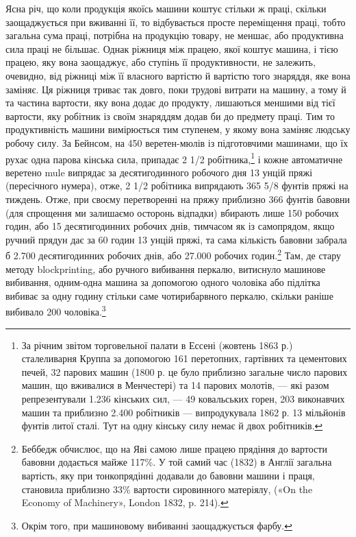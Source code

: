 Ясна річ, що коли продукція якоїсь машини коштує стільки ж
праці, скільки заощаджується при вживанні її, то відбувається
просте переміщення праці, тобто загальна сума праці, потрібна
на продукцію товару, не меншає, або продуктивна сила праці не
більшає. Однак ріжниця між працею, якої коштує машина, і
тією працею, яку вона заощаджує, або ступінь її продуктивности,
не залежить, очевидно, від ріжниці між її власного вартістю й
вартістю того знаряддя, яке вона заміняє. Ця ріжниця триває
так довго, поки трудові витрати на машину, а тому й та частина
вартости, яку вона додає до продукту, лишаються меншими від
тієї вартости, яку робітник із своїм знаряддям додав би до предмету
праці. Тим то продуктивність машини вимірюється тим
ступенем, у якому вона заміняє людську робочу силу. За Бейнсом,
на 450 веретен-мюлів із підготовчими машинами, що їх рухає
одна парова кінська сила, припадає 2 1/2 робітника,\footnote{
За річним звітом торговельної палати в Ессені (жовтень 1863 р.)
сталеливарня Круппа за допомогою 161 перетопних, гартівних та цементових
печей, 32 парових машин (1800 р. це було приблизно загальне число
парових машин, що вживалися в Менчестері) та 14 парових молотів, —
які разом репрезентували 1.236 кінських сил, — 49 ковальських горен,
203 виконавчих машин та приблизно 2.400 робітників — випродукувала
1862 р. 13 мільйонів фунтів литої сталі. Тут на одну кінську силу немає
й двох робітників.
} і кожне
автоматичне веретено mule випрядає за десятигодинного робочого
дня 13 унцій пряжі (пересічного нумера), отже, 2 1/2 робітника
випрядають 365 5/8 фунтів пряжі на тиждень. Отже, при своєму
перетворенні на пряжу приблизно 366 фунтів бавовни (для спрощення
ми залишаємо осторонь відпадки) вбирають лише 150 робочих
годин, або 15 десятигодинних робочих днів, тимчасом як із
самопрядом, якщо ручний прядун дає за 60 годин 13 унцій пряжі,
та сама кількість бавовни забрала б 2.700 десятигодинних робочих
днів, або 27.000 робочих годин.\footnote{
Беббедж обчислює, що на Яві самою лише працею прядіння до
вартости бавовни додається майже 117\%. У той самий час (1832) в Англії
загальна вартість, яку при тонкопрядінні додавали до бавовни машини
і праця, становила приблизно 33\% вартости сировинного матеріялу,
(«On the Economy of Machinery», London 1832, p. 214).
} Там, де стару методу
blockprinting, або ручного вибивання перкалю, витиснуло машинове
вибивання, одним-одна машина за допомогою одного чоловіка
або підлітка вибиває за одну годину стільки саме чотирибарвного
перкалю, скільки раніше вибивало 200 чоловіка.\footnote{
Окрім того, при машиновому вибиванні заощаджується фарбу.
}

